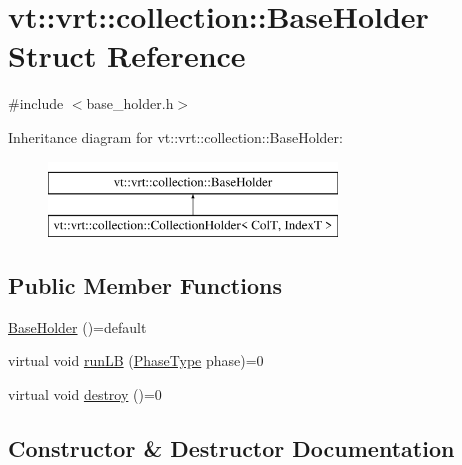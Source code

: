 \hypertarget{structvt_1_1vrt_1_1collection_1_1_base_holder}{}\section{vt\+:\+:vrt\+:\+:collection\+:\+:Base\+Holder Struct Reference}
\label{structvt_1_1vrt_1_1collection_1_1_base_holder}


{\ttfamily \#include $<$base\+\_\+holder.\+h$>$}

Inheritance diagram for vt\+:\+:vrt\+:\+:collection\+:\+:Base\+Holder\+:\begin{figure}[H]
\begin{center}
\leavevmode
\includegraphics[height=2.000000cm]{structvt_1_1vrt_1_1collection_1_1_base_holder}
\end{center}
\end{figure}
\subsection*{Public Member Functions}
\begin{DoxyCompactItemize}
\item 
\hyperlink{structvt_1_1vrt_1_1collection_1_1_base_holder_a748c42f9fcddba89eae7d55424080e4e}{Base\+Holder} ()=default
\item 
virtual void \hyperlink{structvt_1_1vrt_1_1collection_1_1_base_holder_ab9f7a730ced86b24d75b3f33ea3db3e8}{run\+LB} (\hyperlink{namespacevt_a46ce6733d5cdbd735d561b7b4029f6d7}{Phase\+Type} phase)=0
\item 
virtual void \hyperlink{structvt_1_1vrt_1_1collection_1_1_base_holder_a56c8289f60121e38f3699bcfafbbd491}{destroy} ()=0
\end{DoxyCompactItemize}


\subsection{Constructor \& Destructor Documentation}
\mbox{\label{structvt_1_1vrt_1_1collection_1_1_base_holder_a748c42f9fcddba89eae7d55424080e4e}} 
